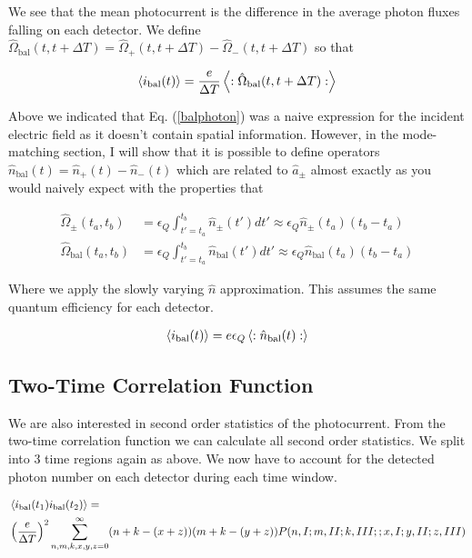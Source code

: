\documentclass[12pt]{article}
\newcommand{\ep}{\epsilon}
\begin{document}
We see that the mean photocurrent is the difference in the average photon fluxes falling on each detector. We define $\hat{\Omega}_{\text{bal}}(t,t+\Delta T) = \hat{\Omega}_+(t,t+\Delta T) - \hat{\Omega}_-(t,t+\Delta T)$ so that

\begin{align}
\Braket{i_{\text{bal}}(t)} = \frac{e}{\Delta T}\Braket{:\hat{\Omega}_{\text{bal}}(t,t+\Delta T):}
\end{align}

Above we indicated that Eq. (\ref{balphoton}) was a naive expression for the incident electric field as it doesn't contain spatial information. However, in the mode-matching section, I will show that it is possible to define operators $\hat{n}_{\text{bal}}(t) = \hat{n}_+(t) - \hat{n}_-(t)$ which are related to $\hat{a}_{\pm}$ almost exactly as you would naively expect with the properties that

\begin{align}
\hat{\Omega}_{\pm}(t_a,t_b) &= \ep_Q\int_{t'=t_a}^{t_b} \hat{n}_{\pm}(t') dt' \approx \ep_Q \hat{n}_{\pm}(t_a) (t_b-t_a)\\
\hat{\Omega}_{\text{bal}}(t_a,t_b) &= \ep_Q\int_{t'=t_a}^{t_b} \hat{n}_{\text{bal}}(t') dt' \approx \ep_Q \hat{n}_{\text{bal}}(t_a) (t_b-t_a)
\end{align}

Where we apply the slowly varying $\hat{n}$ approximation. This assumes the same quantum efficiency for each detector.

\begin{align}
\Braket{i_{\text{bal}}(t)} = e\ep_Q \Braket{:\hat{n}_{\text{bal}}(t):}
\end{align}

\subsection{Two-Time Correlation Function}

We are also interested in second order statistics of the photocurrent. From the two-time correlation function we can calculate all second order statistics. We split into 3 time regions again as above. We now have to account for the detected photon number on each detector during each time window.

\begin{align}
&\Braket{i_{\text{bal}}(t_1)i_{\text{bal}}(t_2)} =\\
&\left(\frac{e}{\Delta T}\right)^2 \sum_{n,m,k,x,y,z=0}^{\infty} (n+k-(x+z))(m+k-(y+z))P(n,I;m,II;k,III ;; x,I ; y,II ; z,III)
\end{align}
\end{document}
